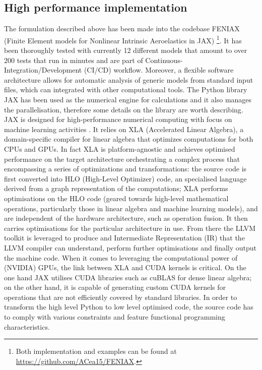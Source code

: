 \documentclass[11pt]{article}
\begin{document}
\subsection{High performance implementation}
\label{sec:org4d4d0f1}
The formulation described above has been made into the codebase FENIAX (Finite Element models for Nonlinear Intrinsic Aeroelastics in JAX) \footnote{Both implementation and examples can be found at \url{https://github.com/ACea15/FENIAX}.}. It has been thoroughly tested with currently 12 different models that amount to over 200 tests that run in minutes and are part of Continuous-Integration/Development (CI/CD) workflow. Moreover, a flexible software architecture allows for automatic analysis of generic models from standard input files, which can integrated with other computational tools.
The Python library JAX has been used as the numerical engine for calculations and it also manages the parallelisation, therefore some details on the library are worth describing.
JAX is designed for high-performance numerical computing with focus on machine learning activities \cite{BRADBURY2018}. It relies on XLA (Accelerated Linear Algebra), a domain-specific compiler for linear algebra that optimizes computations for both CPUs and GPUs. In fact XLA is platform-agnostic and achieves optimised performance on the target architecture orchestrating a complex process that encompassing a series of optimizations and transformations: the source code is first converted into HLO (High-Level Optimizer) code, an specialised language derived from a graph representation of the computations; XLA performs optimisations on the HLO code (geared towards high-level mathematical operations, particularly those in linear algebra and machine learning models), and are independent of the hardware architecture, such as operation fusion. It then carries optimisations for the particular architecture in use. From there the LLVM toolkit is leveraged to produce and Intermediate Representation (IR) that the LLVM compiler can understand, perform further optimisations and finally output the machine code. 
When it comes to leveraging the computational power of (NVIDIA) GPUs, the link between XLA and CUDA kernels is critical. On the one hand JAX utilises CUDA libraries such as cuBLAS for dense linear algebra; on the other hand, it is capable of generating custom CUDA kernels for operations that are not efficiently covered by standard libraries. 
In order to transform the high level Python to low level optimised code, the source code has to comply with various constraints and feature functional programming characteristics.
\end{document}
